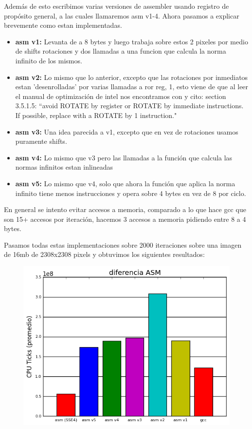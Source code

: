 \documentclass[a4paper]{article}
\begin{document}

Además de esto escribimos varias versiones de assembler usando registro de propósito general, a las cuales llamaremos asm v1-4. Ahora pasamos a explicar brevemente como estan implementadas.

\begin{itemize}[label={}]
\item[] \textbf{asm v1:} Levanta de a 8 bytes y luego trabaja sobre estos 2 pixeles por medio de shifts rotaciones y dos llamadas a una funcion que calcula la norma infinito de los mismos.
\item[] \textbf{asm v2:} Lo mismo que lo anterior, excepto que las rotaciones por inmediatos estan 'desenrolladas' por varias llamadas a ror reg, 1, esto viene de que al leer el manual de optimización de intel nos encontramos con y cito: section 3.5.1.5: ``avoid ROTATE by register or ROTATE by immediate instructions. If possible, replace with a ROTATE by 1 instruction."
\item[] \textbf{asm v3:} Una idea parecida a v1, excepto que en vez de rotaciones usamos puramente shifts.
\item[] \textbf{asm v4:} Lo mismo que v3 pero las llamadas a la función que calcula las normas infinitos estan inlineadas
\item[] \textbf{asm v5:} Lo mismo que v4, solo que ahora la función que aplica la norma infinito tiene menos instrucciones y opera sobre 4 bytes en vez de 8 por ciclo.
\end{itemize}

En general se intento evitar accesos a memoria, comparado a lo que hace gcc que son 15+ accesos por iteración, hacemos 3 accesos a memoria pidiendo entre 8 a 4 bytes.

Pasamos todas estas implementaciones sobre 2000 iteraciones sobre una imagen de 16mb de 2308x2308 pixels y obtuvimos los siguientes resultados:

\begin{figure}[h]
	\centerline{\includegraphics[scale=0.8]{imagenes/test_diferencia_ASM_imp}}
\end{figure}
\end{document}
